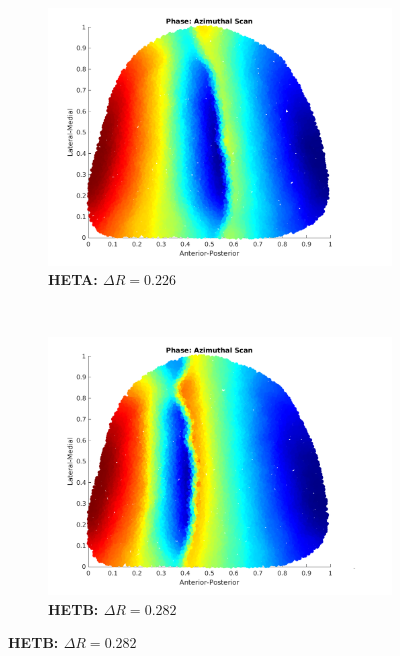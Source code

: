 \begin{figure}[h]
	\begin{subfigure}{0.45\textwidth}
		\centering
		\includegraphics[width=\textwidth]{images/lattice/hetA_DR08}
		\caption{\textbf{HETA: $\Delta R =  0.226$}}
	\end{subfigure}
~
	\begin{subfigure}{0.45\textwidth}
		\centering
		\includegraphics[width=\textwidth]{images/lattice/HetB_DR_10}
		\caption{\textbf{HETB: $\Delta R =  0.282$}}
	\end{subfigure}


\end{figure}
